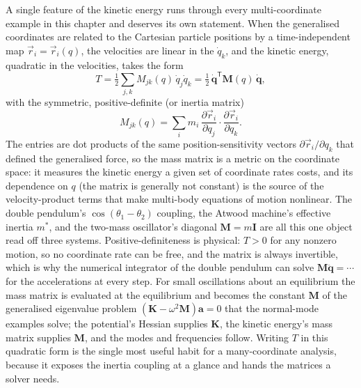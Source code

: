  A single
feature of the kinetic energy runs through every multi-coordinate example in
this chapter and deserves its own statement. When the generalised
coordinates are related to the Cartesian particle positions by a
time-independent map $\vec r_i = \vec r_i(q)$, the velocities are linear in
the $\dot q_k$, and the kinetic energy, quadratic in the velocities, takes
the form
\[
T = \tfrac12\sum_{j,k} M_{jk}(q)\,\dot q_j\dot q_k
= \tfrac12\,\dot{\mathbf q}^{\mathsf T}\mathbf{M}(q)\,\dot{\mathbf q},
\]
with the symmetric, positive-definite  (or inertia
matrix)
\[
M_{jk}(q) = \sum_i m_i\,
\frac{\partial\vec r_i}{\partial q_j}\cdot
\frac{\partial\vec r_i}{\partial q_k}.
\]
The entries are dot products of the same position-sensitivity vectors
$\partial\vec r_i/\partial q_k$ that defined the generalised force, so the
mass matrix is a metric on the coordinate space: it measures the kinetic
energy a given set of coordinate rates costs, and its dependence on $q$ (the
matrix is generally not constant) is the source of the velocity-product terms
that make multi-body equations of motion nonlinear. The double pendulum's
$\cos(\theta_1 - \theta_2)$ coupling, the Atwood machine's effective inertia
$m^\ast$, and the two-mass oscillator's diagonal $\mathbf M = m\mathbf I$ are
all this one object read off three systems. Positive-definiteness is
physical: $T > 0$ for any nonzero motion, so no coordinate rate can be free,
and the matrix is always invertible, which is why the numerical integrator of
the double pendulum can solve $\mathbf M\ddot{\mathbf q} = \cdots$ for the
accelerations at every step. For small oscillations about an equilibrium the
mass matrix is evaluated at the equilibrium and becomes the constant
$\mathbf M$ of the generalised eigenvalue problem $(\mathbf K -
\omega^2\mathbf M)\mathbf a = 0$ that the normal-mode examples solve; the
potential's Hessian supplies $\mathbf K$, the kinetic energy's mass matrix
supplies $\mathbf M$, and the modes and frequencies follow. Writing $T$ in
this quadratic form is the single most useful habit for a many-coordinate
analysis, because it exposes the inertia coupling at a glance and hands the
matrices a solver needs.

